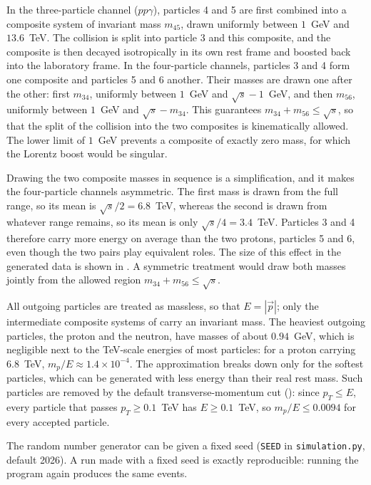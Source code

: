 \documentclass{article}
\begin{document}
\par In the three-particle channel ($pp\gamma$), particles 4 and 5 are first combined into a composite system of invariant mass $m_{45}$, drawn uniformly between $1$~GeV and $13.6$~TeV. The collision is split into particle 3 and this composite, and the composite is then decayed isotropically in its own rest frame and boosted back into the laboratory frame. In the four-particle channels, particles 3 and 4 form one composite and particles 5 and 6 another. Their masses are drawn one after the other: first $m_{34}$, uniformly between $1$~GeV and $\sqrt{s} - 1$~GeV, and then $m_{56}$, uniformly between $1$~GeV and $\sqrt{s} - m_{34}$. This guarantees $m_{34} + m_{56} \le \sqrt{s}$, so that the split of the collision into the two composites is kinematically allowed. The lower limit of $1$~GeV prevents a composite of exactly zero mass, for which the Lorentz boost would be singular.

\par Drawing the two composite masses in sequence is a simplification, and it makes the four-particle channels asymmetric. The first mass is drawn from the full range, so its mean is $\sqrt{s}/2 = 6.8$~TeV, whereas the second is drawn from whatever range remains, so its mean is only $\sqrt{s}/4 = 3.4$~TeV. Particles 3 and 4 therefore carry more energy on average than the two protons, particles 5 and 6, even though the two pairs play equivalent roles. The size of this effect in the generated data is shown in . A symmetric treatment would draw both masses jointly from the allowed region $m_{34} + m_{56} \le \sqrt{s}$.

\par All outgoing particles are treated as massless, so that $E = |\vec{p}|$; only the intermediate composite systems of  carry an invariant mass. The heaviest outgoing particles, the proton and the neutron, have masses of about $0.94$~GeV, which is negligible next to the TeV-scale energies of most particles: for a proton carrying $6.8$~TeV, $m_p/E \approx 1.4 \times 10^{-4}$. The approximation breaks down only for the softest particles, which can be generated with less energy than their real rest mass. Such particles are removed by the default transverse-momentum cut (): since $p_T \le E$, every particle that passes $p_T \ge 0.1$~TeV has $E \ge 0.1$~TeV, so $m_p/E \le 0.0094$ for every accepted particle.

\par The random number generator can be given a fixed seed (\texttt{SEED} in \texttt{simulation.py}, default 2026). A run made with a fixed seed is exactly reproducible: running the program again produces the same events.
\end{document}
